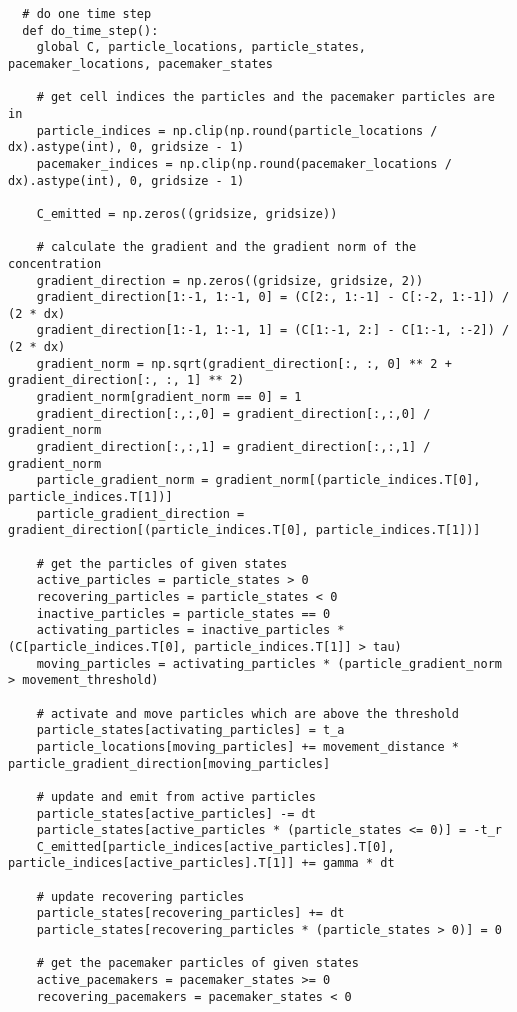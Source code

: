\begin{verbatim}
  # do one time step
  def do_time_step():
    global C, particle_locations, particle_states, pacemaker_locations, pacemaker_states

    # get cell indices the particles and the pacemaker particles are in
    particle_indices = np.clip(np.round(particle_locations / dx).astype(int), 0, gridsize - 1)
    pacemaker_indices = np.clip(np.round(pacemaker_locations / dx).astype(int), 0, gridsize - 1)

    C_emitted = np.zeros((gridsize, gridsize))

    # calculate the gradient and the gradient norm of the concentration
    gradient_direction = np.zeros((gridsize, gridsize, 2))
    gradient_direction[1:-1, 1:-1, 0] = (C[2:, 1:-1] - C[:-2, 1:-1]) / (2 * dx)
    gradient_direction[1:-1, 1:-1, 1] = (C[1:-1, 2:] - C[1:-1, :-2]) / (2 * dx)
    gradient_norm = np.sqrt(gradient_direction[:, :, 0] ** 2 + gradient_direction[:, :, 1] ** 2)
    gradient_norm[gradient_norm == 0] = 1
    gradient_direction[:,:,0] = gradient_direction[:,:,0] / gradient_norm
    gradient_direction[:,:,1] = gradient_direction[:,:,1] / gradient_norm
    particle_gradient_norm = gradient_norm[(particle_indices.T[0], particle_indices.T[1])]
    particle_gradient_direction = gradient_direction[(particle_indices.T[0], particle_indices.T[1])]

    # get the particles of given states
    active_particles = particle_states > 0
    recovering_particles = particle_states < 0
    inactive_particles = particle_states == 0
    activating_particles = inactive_particles * (C[particle_indices.T[0], particle_indices.T[1]] > tau)
    moving_particles = activating_particles * (particle_gradient_norm > movement_threshold)

    # activate and move particles which are above the threshold
    particle_states[activating_particles] = t_a
    particle_locations[moving_particles] += movement_distance * particle_gradient_direction[moving_particles]

    # update and emit from active particles
    particle_states[active_particles] -= dt
    particle_states[active_particles * (particle_states <= 0)] = -t_r
    C_emitted[particle_indices[active_particles].T[0], particle_indices[active_particles].T[1]] += gamma * dt
    
    # update recovering particles
    particle_states[recovering_particles] += dt
    particle_states[recovering_particles * (particle_states > 0)] = 0

    # get the pacemaker particles of given states
    active_pacemakers = pacemaker_states >= 0
    recovering_pacemakers = pacemaker_states < 0


\end{verbatim}
